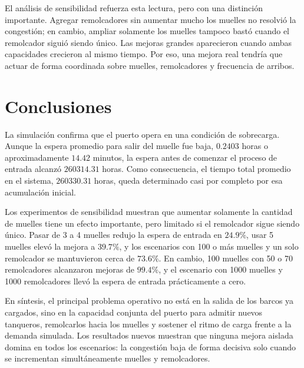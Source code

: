 \documentclass[12pt]{article}
\begin{document}
El análisis de sensibilidad refuerza esta lectura, pero con una distinción importante. Agregar remolcadores sin aumentar mucho los muelles no resolvió la congestión; en cambio, ampliar solamente los muelles tampoco bastó cuando el remolcador siguió siendo único. Las mejoras grandes aparecieron cuando ambas capacidades crecieron al mismo tiempo. Por eso, una mejora real tendría que actuar de forma coordinada sobre muelles, remolcadores y frecuencia de arribos.

\section{Conclusiones}

La simulación confirma que el puerto opera en una condición de sobrecarga. Aunque la espera promedio para salir del muelle fue baja, $0.2403$ horas o aproximadamente $14.42$ minutos, la espera antes de comenzar el proceso de entrada alcanzó $260314.31$ horas. Como consecuencia, el tiempo total promedio en el sistema, $260330.31$ horas, queda determinado casi por completo por esa acumulación inicial.

Los experimentos de sensibilidad muestran que aumentar solamente la cantidad de muelles tiene un efecto importante, pero limitado si el remolcador sigue siendo único. Pasar de 3 a 4 muelles redujo la espera de entrada en $24.9\%$, usar 5 muelles elevó la mejora a $39.7\%$, y los escenarios con 100 o más muelles y un solo remolcador se mantuvieron cerca de $73.6\%$. En cambio, 100 muelles con 50 o 70 remolcadores alcanzaron mejoras de $99.4\%$, y el escenario con 1000 muelles y 1000 remolcadores llevó la espera de entrada prácticamente a cero.

En síntesis, el principal problema operativo no está en la salida de los barcos ya cargados, sino en la capacidad conjunta del puerto para admitir nuevos tanqueros, remolcarlos hacia los muelles y sostener el ritmo de carga frente a la demanda simulada. Los resultados nuevos muestran que ninguna mejora aislada domina en todos los escenarios: la congestión baja de forma decisiva solo cuando se incrementan simultáneamente muelles y remolcadores.
\end{document}
